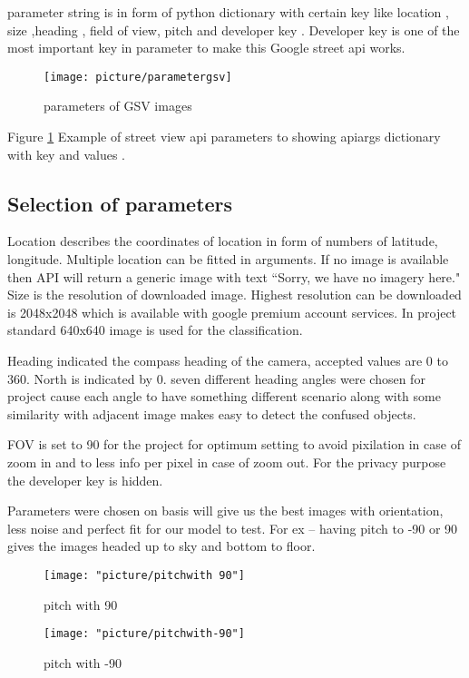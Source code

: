 parameter string is in form of python dictionary with certain key like location , size ,heading , field of view, pitch and developer key . Developer key is one of the most important key in parameter to make this Google street api works. 

\begin{figure}
	\centering
	\texttt{[image: picture/parametergsv]}
	\caption{parameters of GSV images}
	\label{fig:parametergsv}
\end{figure}

Figure \ref{fig:parametergsv} Example of street view api parameters to showing apiargs dictionary with key and values .

\subsection{Selection of parameters}

Location describes the coordinates of location in form of numbers of latitude, longitude. Multiple location can be fitted in arguments. If no image is available then API will return a generic image with text “Sorry, we have no imagery here."
Size is the resolution of downloaded image. Highest resolution can be downloaded is 2048x2048 which is available with google premium account services. In project standard 640x640 image is used for the classification.

Heading indicated the compass heading of the camera, accepted values are 0 to 360. North is indicated by 0. seven different heading angles were chosen for project cause each angle to have something different scenario along with some similarity with adjacent image makes easy to detect the confused objects.

FOV is set to 90 for the project for optimum setting to avoid pixilation in case of zoom in and to less info per pixel in case of zoom out. For the privacy purpose the developer key is hidden.

Parameters were chosen on basis will give us the best images with orientation, less noise and perfect fit for our model to test. For ex – having pitch to -90 or 90 gives the images headed up to sky and bottom to floor.

\begin{figure}
	\centering
	\texttt{[image: "picture/pitchwith 90"]}
	\caption{pitch with 90}
	\label{fig:pitchwith 90}
\end{figure}

\begin{figure}
	\centering
	\texttt{[image: "picture/pitchwith-90"]}
	\caption{pitch with -90}
	\label{fig:pitchwith-90}
\end{figure}


